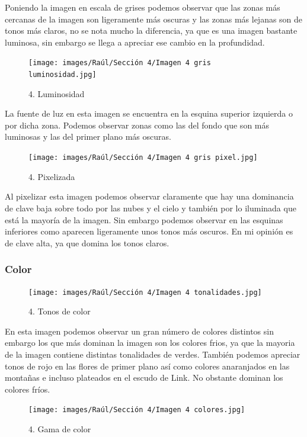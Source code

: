\documentclass[12pt]{article}
\begin{document}
Poniendo la imagen en escala de grises podemos observar que las zonas más cercanas de la imagen son ligeramente más oscuras y las zonas más lejanas son de tonos más claros, no se nota mucho la diferencia, ya que es una imagen bastante luminosa, sin embargo se llega a apreciar ese cambio en la profundidad.

\begin{figure}[H]
      \centering
      \texttt{[image: images/Raúl/Sección 4/Imagen 4 gris luminosidad.jpg]}
      \caption{\small 4. Luminosidad}
\end{figure}

La fuente de luz en esta imagen se encuentra en la esquina superior izquierda o por dicha zona. Podemos observar zonas como las del fondo que son más luminosas y las del primer plano más oscuras.

\begin{figure}[H]
      \centering
      \texttt{[image: images/Raúl/Sección 4/Imagen 4 gris pixel.jpg]}
      \caption{\small 4. Pixelizada}
\end{figure}

Al pixelizar esta imagen podemos observar claramente que hay una dominancia de clave baja sobre todo por las nubes y el cielo y también por lo iluminada que está la mayoría de la imagen. Sin embargo podemos observar en las esquinas inferiores como aparecen ligeramente unos tonos más oscuros. En mi opinión es de clave alta, ya que domina los tonos claros.


        \subsubsection{Color}

\begin{figure}[H]
      \centering
      \texttt{[image: images/Raúl/Sección 4/Imagen 4 tonalidades.jpg]}
      \caption{\small 4. Tonos de color}
\end{figure}
En esta imagen podemos observar un gran número de colores distintos sin embargo los que más dominan la imagen son los colores frios, ya que la mayoria de la imagen contiene distintas tonalidades de verdes. También podemos apreciar tonos de rojo en las flores de primer plano así como colores anaranjados en las montañas e incluso plateados en el escudo de Link. No obstante dominan los colores fríos.

\begin{figure}[H]
      \centering
      \texttt{[image: images/Raúl/Sección 4/Imagen 4 colores.jpg]}
      \caption{\small 4. Gama de color}
\end{figure}
\end{document}
